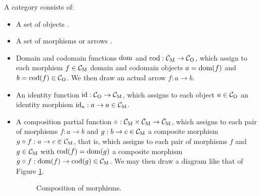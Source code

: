 \begin{definition}
  \label{def:category}



  A category  consists of:
  \begin{itemize}
  \item

    A set of objects .

  \item

    A set of morphisms or arrows .

  \item

    Domain and codomain functions $\operatorname{dom}$ and $\operatorname{cod}: \mathcal{C}_{\operatorname{M}} \to
    \mathcal{C}_{\operatorname{O}}$, which assign to each morphism $f \in \mathcal{C}_{\operatorname{M}}$ domain
    and codomain objects $a = \operatorname{dom}(f)$ and $b = \operatorname{cod}(f) \in \mathcal{C}_{\operatorname{O}}$.
    We then draw an actual arrow $f: a \to b$.

  \item

    An identity function $\operatorname{id}: \mathcal{C}_{\operatorname{O}} \to \mathcal{C}_{\operatorname{M}}$, which assigns
    to each object $a \in \mathcal{C}_{\operatorname{O}}$ an identity morphism $\operatorname{id}_{a}: a
    \to a \in \mathcal{C}_{\operatorname{M}}$.

  \item

    A composition partial function $\comp\ : \catM{C} \times \catM{C}
    \to \catM{C}$, which assigns to each pair of morphisms $f: a \to
    b$ and $g: b \to c \in \mathcal{C}_{\operatorname{M}}$ a composite morphism $g \mathrel{\circ} f:
    a \to c \in \mathcal{C}_{\operatorname{M}}$, that is, which assigns to each pair of
    morphisms $f$ and $g \in \mathcal{C}_{\operatorname{M}}$ with $\operatorname{cod}(f) = \operatorname{dom}(g)$ a
    composite morphism $g \mathrel{\circ} f: \operatorname{dom}(f) \to \operatorname{cod}(g) \in \mathcal{C}_{\operatorname{M}}$.
    We may then draw a diagram like that of Figure
    \ref{fig:category-composition}.

    \begin{figure}[htbp]
      \begin{center}
      \end{center}
      \caption{Composition of morphisms.}
      \label{fig:category-composition}
    \end{figure}


\end{itemize}
\end{definition}
